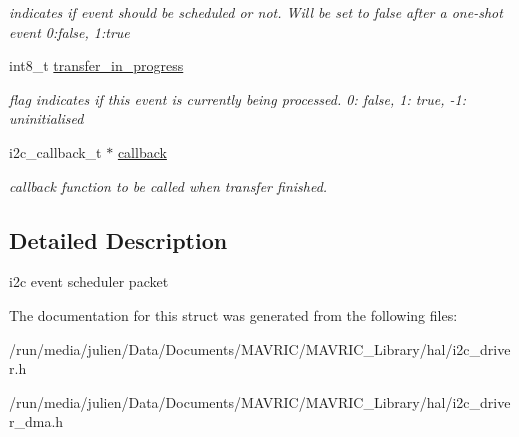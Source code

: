 \begin{DoxyCompactItemize}
\begin{DoxyCompactList}\small\item\em indicates if event should be scheduled or not. Will be set to false after a one-\/shot event 0\+:false, 1\+:true \end{DoxyCompactList}\item 
\hypertarget{structi2c__schedule__event__t_adb0cb1aa83da29a7d9be23348e55ba68}{int8\+\_\+t \hyperlink{structi2c__schedule__event__t_adb0cb1aa83da29a7d9be23348e55ba68}{transfer\+\_\+in\+\_\+progress}}\label{structi2c__schedule__event__t_adb0cb1aa83da29a7d9be23348e55ba68}

\begin{DoxyCompactList}\small\item\em flag indicates if this event is currently being processed. 0\+: false, 1\+: true, -\/1\+: uninitialised \end{DoxyCompactList}\item 
\hypertarget{structi2c__schedule__event__t_aa7cf80b00644e056fdcea990445c98c7}{i2c\+\_\+callback\+\_\+t $\ast$ \hyperlink{structi2c__schedule__event__t_aa7cf80b00644e056fdcea990445c98c7}{callback}}\label{structi2c__schedule__event__t_aa7cf80b00644e056fdcea990445c98c7}

\begin{DoxyCompactList}\small\item\em callback function to be called when transfer finished. \end{DoxyCompactList}\end{DoxyCompactItemize}


\subsection{Detailed Description}
i2c event scheduler packet 

The documentation for this struct was generated from the following files\+:\begin{DoxyCompactItemize}
\item 
/run/media/julien/\+Data/\+Documents/\+M\+A\+V\+R\+I\+C/\+M\+A\+V\+R\+I\+C\+\_\+\+Library/hal/i2c\+\_\+driver.\+h\item 
/run/media/julien/\+Data/\+Documents/\+M\+A\+V\+R\+I\+C/\+M\+A\+V\+R\+I\+C\+\_\+\+Library/hal/i2c\+\_\+driver\+\_\+dma.\+h\end{DoxyCompactItemize}
